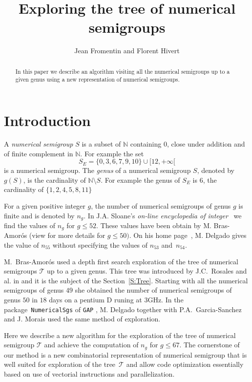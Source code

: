 \documentclass[reqno,11pt]{amsart}
\title{Exploring the tree of numerical semigroups}
\author{Jean Fromentin and  Florent Hivert}
\theoremstyle{plain}
\theoremstyle{definition}
\renewcommand{\leq}{\leqslant}
\newcommand{\NN}{\mathbb{N}}
\renewcommand{\tt}[1]{\texttt{#1}}
\newcommand{\Jean}[1]{{\color{blue}#1}}
\begin{document}
\begin{abstract}
In this paper we describe an algorithm visiting all the numerical semigroups up to a given genus using a new representation of numerical semigroups. 
\end{abstract}

\maketitle

\section{Introduction}

A \emph{numerical semigroup} $S$ is a subset of $\NN$ containing $0$, close under addition and of finite complement in $\NN$.  
For example the set 
\begin{equation}
\label{E:NSG}
S_E=\{0,3,6,7,9,10\}\cup[12,+\infty[
\end{equation}
is a numerical semigroup.
The \emph{genus} of a numerical semigroup $S$, denoted by~$g(S)$, is the cardinality of $\NN\setminus S$.
 For example the genus of $S_E$ is $6$,  the cardinality of $\{1,2,4,5,8,11\}$

For a given positive integer $g$, the number of numerical semigroups of genus $g$ is finite and is denoted by $n_g$. 
In  J.A. Sloane's \emph{on-line encyclopedia of integer}~\cite{OEIS} we find the values of $n_g$ for $g\leq 52$. 
These values have been obtain by M. Bras-Amor\'os (view \cite{BrasAmoros2008} for more details for $g\leq 50)$. 
On his home page~\cite{Delgado}, M. Delgado  gives the value of $n_{55}$ without specifying the values of $n_{53}$ and~$n_{54}$. 

M.~Bras-Amor\'os used a depth first search exploration of the tree of numerical semigroups $\mathcal{T}$ up to a given genus.
This tree was introduced by J.C.~Rosales and al. in \cite{Rosales} and it is the subject of the Section~\ref{S:Tree}.
Starting with all the numerical semigroups of genus $49$ she obtained the number of numerical semigroups of genus $50$ in $18$ days on a pentium D runing at $3$GHz. 
In the package~\tt{NumericalSgs} \cite{NumericalSgps} of \tt{GAP} \cite{GAP}, M. Delgado together with P.A.~Garcia-Sanchez and J. Morais used the same method of exploration.


\Jean{Here we describe a new algorithm for the exploration of the tree of numerical semigroup $\mathcal{T}$ and achieve the computation of $n_g$ for $g\leq 67$. 
The cornerstone of our method is a new combinatorial representation of numerical semigroup that is well suited for exploration of the tree~$\mathcal{T}$ and allow code optimization essentially based on use of vectorial instructions and parallelization.}
\end{document}
